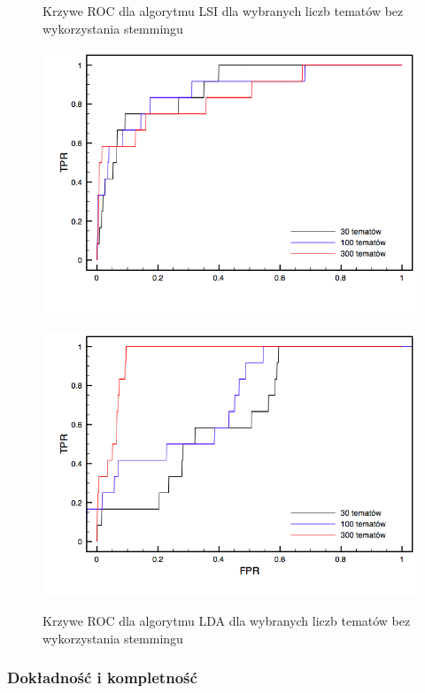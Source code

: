 \documentclass[11pt,a4paper]{article}
\begin{document}
\begin{figure}[h]
\caption{Krzywe ROC dla algorytmu LSI dla wybranych liczb tematów bez wykorzystania stemmingu}
\includegraphics[width=\linewidth]{gfx/lsi_roc_untagged.png}
\label{roc_lsi_untagged}

\caption{Krzywe ROC dla algorytmu LDA dla wybranych liczb tematów bez wykorzystania stemmingu}
\includegraphics[width=\linewidth]{gfx/lda_roc_untagged.png}
\label{roc_lda_untagged}
\end{figure}

\FloatBarrier

\subsubsection{Dokładność i kompletność}
\end{document}
